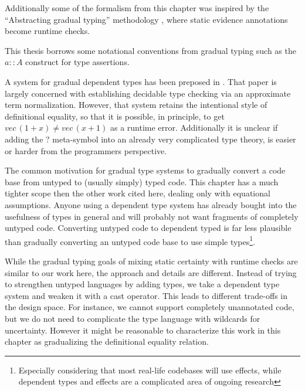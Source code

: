 

Additionally some of the formalism from this chapter was inspired
by the ``Abstracting gradual typing'' methodology \cite{10.1145/2837614.2837670},
where static evidence annotations become runtime checks. %

This thesis borrows some notational conventions from gradual typing
such as the $a::A$ construct for type assertions.

A system for gradual dependent types has been preposed in \cite{10.1145/3341692}.
That paper is largely concerned with establishing decidable type checking
via an approximate term normalization. However, that system retains
the intentional style of definitional equality, so that it is possible,
in principle, to get $vec\,(1+x)\neq vec\,(x+1)$ as a runtime error.
Additionally it is unclear if adding the $?$ meta-symbol into an
already very complicated type theory, is easier or harder from the
programmers perspective.

The common motivation for gradual type systems to gradually convert
a code base from untyped to (usually simply) typed code. This chapter
has a much tighter scope then the other work cited here, dealing only
with equational assumptions. Anyone using a dependent type system
has already bought into the usefulness of types in general and will
probably not want fragments of completely untyped code. Converting
untyped code to dependent typed is far less plausible than gradually
converting an untyped code base to use simple types\footnote{Especially considering that most real-life codebases will use effects,
while dependent types and effects are a complicated area of ongoing
research}.

While the gradual typing goals of mixing static certainty with runtime
checks are similar to our work here, the approach and details are
different. Instead of trying to strengthen untyped languages by adding
types, we take a dependent type system and weaken it with a cast operator.
This leads to different trade-offs in the design space. For instance,
we cannot support completely unannotated code, but we do not need
to complicate the type language with wildcards for uncertainty. However
it might be reasonable to characterize this work in this chapter as
gradualizing the definitional equality relation.

